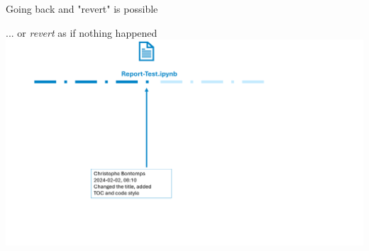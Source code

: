 \documentclass[xcolor=x11names,compress]{beamer}
\renewcommand{\(}{\begin{columns}}
\renewcommand{\)}{\end{columns}}
\newcommand{\<}[1]{\begin{column}{#1}}
\renewcommand{\>}{\end{column}}
\begin{document}
\begin{frame}{Going back and "revert" is possible}
\begin{center}
\begin{itemize}
    {... or \emph{revert} as if nothing happened }
    {\includegraphics[width = 1.0\textwidth]{FileLifeRevert2.png} \\ }

\end{itemize}
\end{center}
\end{frame}
\end{document}
